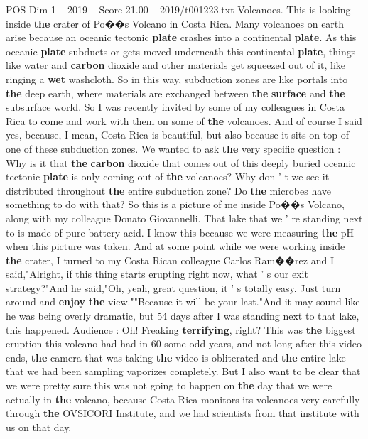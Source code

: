 \begin{textsample}{POS Dim 1 – 2019 – Score 21.00 – 2019/t001223.txt}
Volcanoes.
This is looking inside \textbf{the} crater of Po{\EmojiFont �}{\EmojiFont �}s Volcano in Costa Rica.
Many volcanoes on earth arise because an oceanic tectonic \textbf{plate} crashes into a continental \textbf{plate}.
As this oceanic \textbf{plate} subducts or gets moved underneath this continental \textbf{plate}, things like water and \textbf{carbon} dioxide and other materials get squeezed out of it, like ringing a \textbf{wet} washcloth.
So in this way, subduction zones are like portals into \textbf{the} deep earth, where materials are exchanged between \textbf{the} \textbf{surface} and \textbf{the} subsurface world.
So I was recently invited by some of my colleagues in Costa Rica to come and work with them on some of \textbf{the} volcanoes.
And of course I said yes, because, I mean, Costa Rica is beautiful, but also because it sits on top of one of these subduction zones.
We wanted to ask \textbf{the} very specific question : Why is it that \textbf{the} \textbf{carbon} dioxide that comes out of this deeply buried oceanic tectonic \textbf{plate} is only coming out of \textbf{the} volcanoes?
Why don ' t we see it distributed throughout \textbf{the} entire subduction zone?
Do \textbf{the} microbes have something to do with that?
So this is a picture of me inside Po{\EmojiFont �}{\EmojiFont �}s Volcano, along with my colleague Donato Giovannelli.
That lake that we ' re standing next to is made of pure battery acid.
I know this because we were measuring \textbf{the} pH when this picture was taken.
And at some point while we were working inside \textbf{the} crater, I turned to my Costa Rican colleague Carlos Ram{\EmojiFont �}{\EmojiFont �}rez and I said,"Alright, if this thing starts erupting right now, what ' s our exit strategy?"And he said,"Oh, yeah, great question, it ' s totally easy.
Just turn around and \textbf{enjoy} \textbf{the} view.""Because it will be your last."And it may sound like he was being overly dramatic, but 54 days after I was standing next to that lake, this happened.
Audience : Oh!
Freaking \textbf{terrifying}, right?
This was \textbf{the} biggest eruption this volcano had had in 60-some-odd years, and not long after this video ends, \textbf{the} camera that was taking \textbf{the} video is obliterated and \textbf{the} entire lake that we had been sampling vaporizes completely.
But I also want to be clear that we were pretty sure this was not going to happen on \textbf{the} day that we were actually in \textbf{the} volcano, because Costa Rica monitors its volcanoes very carefully through \textbf{the} OVSICORI Institute, and we had scientists from that institute with us on that day.

\end{textsample}
